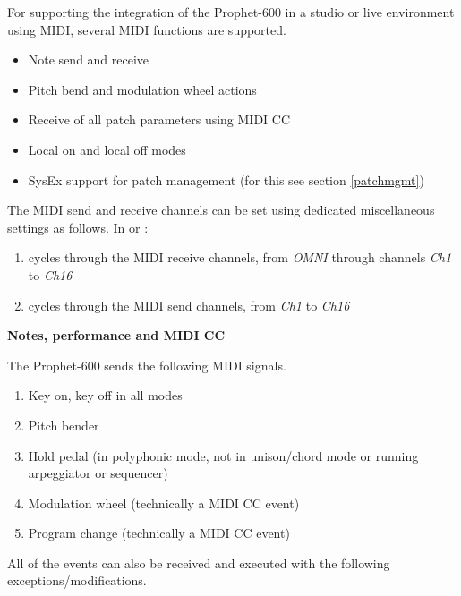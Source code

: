 For supporting the integration of the Prophet-600 in a studio or live environment using MIDI, several MIDI functions are supported.

\begin{itemize}
  \item Note send and receive
  \item Pitch bend and modulation wheel actions
  \item Receive of all patch parameters using MIDI CC
  \item Local on and local off modes
  \item SysEx support for patch management (for this see section \ref{patchmgmt})
\end{itemize}

The MIDI send and receive channels can be set using dedicated miscellaneous settings as follows. In \shiftmode or \shiftlock:

\begin{enumerate}
  \setlength\itemsep{0cm}
  \item {} cycles through the MIDI receive channels, from \textit{OMNI} through channels \textit{Ch1} to \textit{Ch16}
  \item {}  cycles through the MIDI send channels, from \textit{Ch1} to \textit{Ch16}
\end{enumerate}

\textbf{Notes, performance and MIDI CC}

The Prophet-600 sends the following MIDI signals. 

\begin{enumerate}
  \setlength\itemsep{0cm}
  \item Key on, key off in all modes
  \item Pitch bender
  \item Hold pedal (in polyphonic mode, not in unison/chord mode or running arpeggiator or sequencer)
  \item Modulation wheel (technically a MIDI CC event)
  \item Program change (technically a MIDI CC event)
\end{enumerate}

All of the events can also be received and executed with the following exceptions/modifications.

